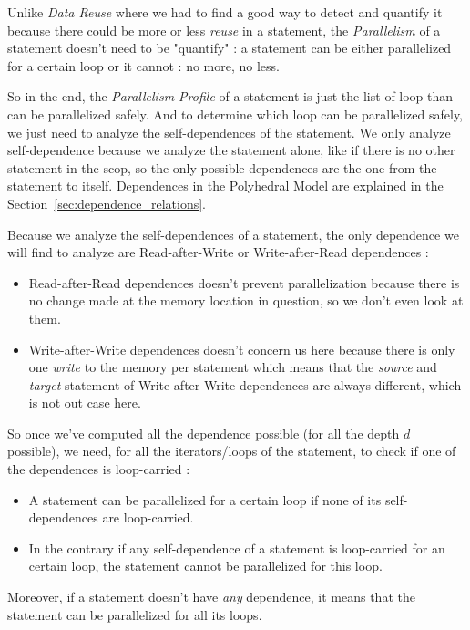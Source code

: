 \documentclass[paper=a4, fontsize=11pt]{scrartcl}
\numberwithin{equation}{section}        %
\numberwithin{figure}{section}          %
\numberwithin{table}{section}               %
\begin{document}
        Unlike \textit{Data Reuse} where we had to find a good way to detect and quantify it
        because there could be more or less \textit{reuse} in a statement, the \textit{Parallelism}
        of a statement doesn't need to be "quantify" : a statement can be either parallelized
        for a certain loop or it cannot : no more, no less.

        So in the end, the \textit{Parallelism Profile} of a statement is just the list
        of loop than can be parallelized safely. And to determine which loop can be parallelized
        safely, we just need to analyze the \glspl{self-dependence} of the statement.
        We only analyze \gls{self-dependence} because we analyze the statement alone, 
        like if there is no other statement in the scop, so the only possible dependences
        are the one from the statement to itself.
        Dependences in the Polyhedral Model are explained in the Section~\ref{sec:dependence_relations}.
       
        \bigskip

        Because we analyze the \glspl{self-dependence} of a statement, the only
        dependence we will find to analyze are Read-after-Write or Write-after-Read dependences :
        \begin{itemize}
            \item Read-after-Read dependences doesn't prevent parallelization because there is no
                change made at the memory location in question, so we don't even look at them.
        
            \item Write-after-Write dependences doesn't concern us here because there is
                only one \textit{write} to the memory per statement which means that
                the \textit{source} and \textit{target} statement of Write-after-Write
                dependences are always different, which is not out case here.
        \end{itemize}
        
        So once we've computed all the dependence possible (for all the depth $d$ possible),
        we need, for all the iterators/loops of the statement, to check if one of the dependences
        is loop-carried :
        \begin{itemize}
            \item A statement can be parallelized for a certain loop if none of its \glspl{self-dependence}
                are loop-carried.
            \item In the contrary if any \gls{self-dependence} of a statement is loop-carried for an certain loop,
                the statement cannot be parallelized for this loop.
        \end{itemize}
        Moreover, if a statement doesn't have \textit{any} dependence, it means that the
        statement can be parallelized for all its loops.
\end{document}
